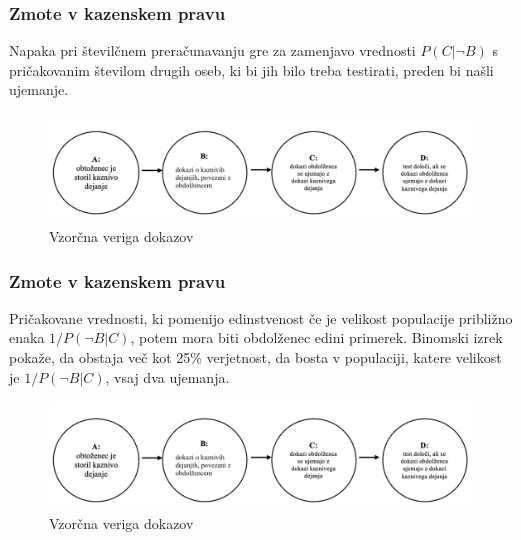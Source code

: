 \documentclass{beamer}
\begin{document}
\begin{frame}
    \frametitle{Zmote v kazenskem pravu}
    \begin{block}{Napaka pri številčnem preračunavanju}
        gre za zamenjavo vrednosti $P(C \lvert \neg B)$ s pričakovanim številom drugih oseb, ki bi jih bilo treba testirati, preden bi našli ujemanje.
    \end{block}
    \begin{figure}[!ht]\label{fig:slika_3}
        \centering
        \includegraphics[scale=0.50]{slika_3.png}
        \caption{Vzorčna veriga dokazov}
    \end{figure}
\end{frame}

\begin{frame}
    \frametitle{Zmote v kazenskem pravu}
    \begin{block}{Pričakovane vrednosti, ki pomenijo edinstvenost}
        če je velikost populacije približno enaka $1/P(\neg B \lvert C)$, potem mora biti
        obdolženec edini primerek. Binomski izrek pokaže, da obstaja več kot 25\% verjetnost, da bosta v populaciji, katere velikost je $1/P(\neg B \lvert C)$,
        vsaj dva ujemanja.   
    \end{block}
    \begin{figure}[!ht]\label{fig:slika_3}
        \centering
        \includegraphics[scale=0.50]{slika_3.png}
        \caption{Vzorčna veriga dokazov}
    \end{figure}
\end{frame}
\end{document}
